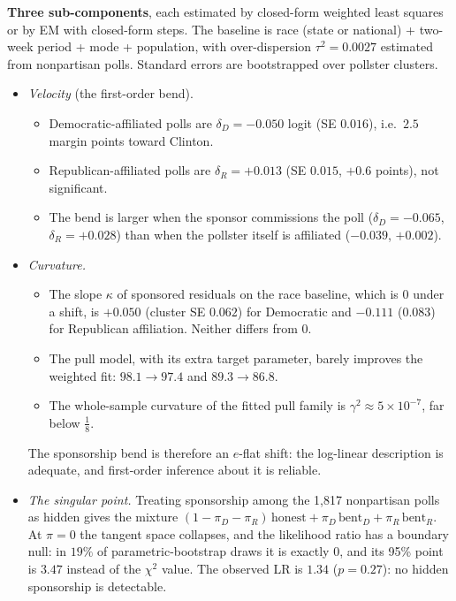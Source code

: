 \documentclass[11pt]{article}
\theoremstyle{definition}
\theoremstyle{remark}
\begin{document}
\textbf{Three sub-components}, each estimated by closed-form weighted least squares or by EM with closed-form steps. The baseline is race (state or national) + two-week period + mode + population, with over-dispersion $\tau^2=0.0027$ estimated from nonpartisan polls. Standard errors are bootstrapped over pollster clusters.
\begin{itemize}
  \item[\textbf{[C1]}] \emph{Velocity} (the first-order bend).
  \begin{itemize}
    \item Democratic-affiliated polls are $\delta_D=-0.050$ logit (SE $0.016$), i.e.\ $2.5$ margin points toward Clinton.
    \item Republican-affiliated polls are $\delta_R=+0.013$ (SE $0.015$, $+0.6$ points), not significant.
    \item The bend is larger when the sponsor commissions the poll ($\delta_D=-0.065$, $\delta_R=+0.028$) than when the pollster itself is affiliated ($-0.039$, $+0.002$).
  \end{itemize}
  \item[\textbf{[C2]}] \emph{Curvature.}
  \begin{itemize}
    \item The slope $\kappa$ of sponsored residuals on the race baseline, which is $0$ under a shift, is $+0.050$ (cluster SE $0.062$) for Democratic and $-0.111$ ($0.083$) for Republican affiliation. Neither differs from $0$.
    \item The pull model, with its extra target parameter, barely improves the weighted fit: $98.1\to97.4$ and $89.3\to86.8$.
    \item The whole-sample curvature of the fitted pull family is $\gamma^2\approx5\times10^{-7}$, far below $\tfrac18$.
  \end{itemize}
  The sponsorship bend is therefore an $e$-flat shift: the log-linear description is adequate, and first-order inference about it is reliable.
  \item[\textbf{[C3]}] \emph{The singular point.} Treating sponsorship among the 1,817 nonpartisan polls as hidden gives the mixture $(1-\pi_D-\pi_R)\,\text{honest}+\pi_D\,\text{bent}_D+\pi_R\,\text{bent}_R$. At $\pi=0$ the tangent space collapses, and the likelihood ratio has a boundary null: in $19\%$ of parametric-bootstrap draws it is exactly $0$, and its 95\% point is $3.47$ instead of the $\chi^2$ value. The observed LR is $1.34$ ($p=0.27$): no hidden sponsorship is detectable.
\end{itemize}
\end{document}
